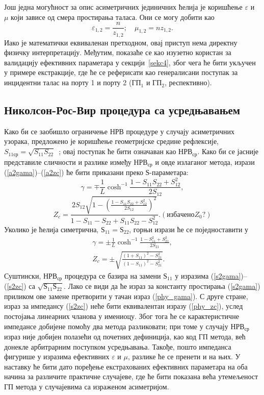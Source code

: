 Још једна могућност за опис асиметричних јединичних ћелија је коришћење $\varepsilon$ и $\mu$ који зависе од смера простирања таласа. Они се могу добити као
\begin{equation}
\varepsilon_{1,2}=\frac{n}{z_{1,2}};\quad \mu_{1,2}=nz_{1,2}.
\end{equation}
Иако је математички еквиваленан претходном, овај приступ нема директну физичку интерпретацију. Међутим, показаће се као изузетно користан за валидацију ефективних параметара у секцији~\ref{sekc4}, због чега ће бити укључен у примере екстракције, где ће се реферисати као генералисани поступак за инцидентни талас на порту 1 и порту 2 ($ГП_1$ и $ГП_2$, респективно).

\subsection{Николсон-Рос-Вир процедура са усредњавањем}

Како би се заобишло ограничење НРВ процедуре у случају асиметричних узорака, предложено је коришћење геометријске средине рефлексије, $S_{11ср}=\sqrt{S_{11}S_{22}}$~\cite{smith:05}; овај поступак ће бити означаван као $НРВ_{ср}$. Како би се јасније представиле сличности и разлике између $НРВ_{ср}$ и овде излаганог метода, изрази (\ref{a2gama})--(\ref{a2zc}) ће бити приказани преко $Ѕ$-параметара:
\begin{equation}\label{phy_gama}
\gamma=\mp\frac{1}{L}\cosh^{-1}{\frac{1-S_{11}S_{22}+S_{12}^2}{2S_{12}}},%
\end{equation}
\begin{equation}\label{phy_zc}
Z_{c} = \frac{2S_{12}\sqrt{1-\left( \frac{1-S_{11}S_{22}+S_{12}^2}{2S_{12}} \right)^2}}{1-S_{11}-S_{22}+S_{11}S_{22}-S_{12}^2}. (избачено Z_0?)
\end{equation}
Уколико је ћелија симетрична, $Ѕ_{11}=Ѕ_{22}$, горњи изрази ће се поједноставити у
\begin{eqnarray}
\gamma = \pm\frac{1}{L}\cosh^{-1}\frac{1-S_{11}^2+S_{21}^2}{2S_{21}},\label{s2gama} \\
Z_c = \pm \sqrt{\frac{(1+S_{11})^2-S_{21}^2}{(1-S_{11})^2-S_{21}^2}}\label{s2zc}.
\end{eqnarray}
Суштински, $НРВ_{ср}$ процедура се базира на замени $Ѕ_{11}$ у изразима (\ref{s2gama})--(\ref{s2zc}) са $\sqrt{Ѕ_{11}Ѕ_{22}}$. Лако се види да ће израз за константу простирања (\ref{s2gama}) приликом ове замене претворити у тачан израз (\ref{phy_gama}). С друге стране, израз за импедансу (\ref{s2zc}) неће бити еквивалентан изразу (\ref{phy_zc}), услед постојања линеарних чланова у имениоцу. Због тога ће се карактеристичне импедансе добијене помоћу два метода разликовати; при томе у случају $НРВ_{ср}$ израз није добијен полазећи од почетних дефиниција, као код ГП метода, већ донекле арбитрарним поступком усредњавања. Такође, пошто импеданса фигурише у изразима ефективних $\varepsilon$ и $\mu$, разлике ће се пренети и на њих. У наставку ће бити дато поређење екстрахованих ефективних параметара на оба начина за различите практичне случајеве, где ће бити показана већа утемељеност ГП метода у случајевима са израженом асиметријом.

